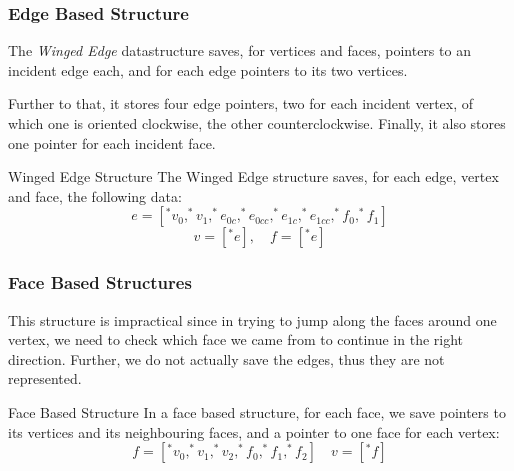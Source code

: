 \documentclass{panikzettel}
\begin{document}
\subsubsection*{Edge Based Structure}

\begin{halfboxl}
The \emph{Winged Edge} datastructure saves, for vertices and faces, pointers to an incident edge each, and for each edge pointers to its two vertices.

Further to that, it stores four edge pointers, two for each incident vertex, of which one is oriented clockwise, the other counterclockwise. Finally, it also stores one pointer for each incident face.
\end{halfboxl}%
\begin{halfboxr}
\vspace{-\baselineskip}
\begin{defi}{Winged Edge Structure}
The Winged Edge structure saves, for each edge, vertex and face, the following data:
$$e = [^*v_0,^*v_1,^*e_{0c},^*e_{0cc},^*e_{1c},^*e_{1cc},^*f_0,^*f_1]$$
$$v=[^*e], \quad f=[^*e]$$
\end{defi}
\end{halfboxr}

\begin{halfboxl}
\subsubsection*{Face Based Structures}

This structure is impractical since in trying to jump along the faces around one vertex, we need to check which face we came from to continue in the right direction. Further, we do not actually save the edges, thus they are not represented.
\end{halfboxl}%
\begin{halfboxr}
\vspace{-\baselineskip}
\begin{defi}{Face Based Structure}
In a face based structure, for each face, we save pointers to its vertices and its neighbouring faces, and a pointer to one face for each vertex:
$$f=[^*v_0,^*v_1,^*v_2,^*f_0,^*f_1,^*f_2] \quad v = [^*f]$$
\end{defi}
\end{halfboxr}
\end{document}
